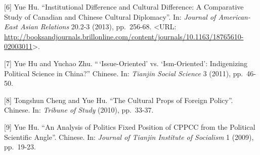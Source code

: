 \documentclass[10.5pt,]{article}
\begin{document}
{[}6{]} Yue Hu. ``Institutional Difference and Cultural Difference: A
Comparative Study of Canadian and Chinese Cultural Diplomacy''. In:
\emph{Journal of American-East Asian Relations} 20.2-3 (2013),
pp.~256-68. \textless{}URL:
\url{http://booksandjournals.brillonline.com/content/journals/10.1163/18765610-02003011}\textgreater{}.

{[}7{]} Yue Hu and Yuchao Zhu. ``\,`Issue-Oriented' vs. `Ism-Oriented':
Indigenizing Political Science in China?'' Chinese. In: \emph{Tianjin
Social Science} 3 (2011), pp.~46-50.

{[}8{]} Tongshun Cheng and Yue Hu. ``The Cultural Props of Foreign
Policy''. Chinese. In: \emph{Tribune of Study} (2010), pp.~33-37.

{[}9{]} Yue Hu. ``An Analysis of Politics Fixed Position of CPPCC from
the Political Scientific Angle''. Chinese. In: \emph{Journal of Tianjin
Institute of Socialism} 1 (2009), pp.~19-23.
\end{document}
